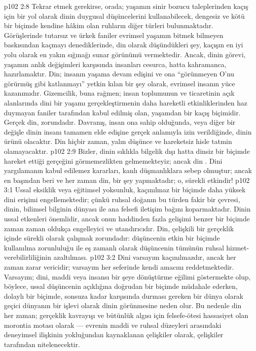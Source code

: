 \vs p102 2:8 Tekrar etmek gerekirse, orada; yaşamın sinir bozucu taleplerinden kaçış için bir yol olarak dinin duygusal düşüncelerini kullanabilecek, dengesiz ve kötü bir biçimde kendine hâkim olan ruhların diğer türleri bulunmaktadır. Görüşlerinde tutarsız ve ürkek faniler evrimsel yaşamın bitmek bilmeyen baskısından kaçmayı denediklerinde, din olarak düşündükleri şey, kaçışın en iyi yolu olarak en yakın sığınağı sunar görünümü vermektedir. Ancak, dinin görevi, yaşamın anlık değişimleri karşısında insanları cesurca, hatta kahramanca, hazırlamaktır. Din; insanın yaşama devam edişini ve ona “görünmeyen O’nu görürmüş gibi katlanmayı” yetkin kılan bir şey olarak, evrimsel insanın yüce kazanımıdır. Gizemcilik, buna rağmen; insan toplumunun ve ticaretinin açık alanlarında dini bir yaşamı gerçekleştirmenin daha hareketli etkinliklerinden haz duymayan faniler tarafından kabul edilmiş olan, yaşamdan bir kaçış biçimidir. Gerçek din,  zorundadır. Davranış, insan ona sahip olduğunda, veya diğer bir değişle dinin insanı tamamen elde edişine gerçek anlamıyla izin verildiğinde, dinin ürünü olacaktır. Din hiçbir zaman, yalın düşünce ve hareketsiz hisle tatmin olamayacaktır.
\vs p102 2:9 Bizler, dinin sıklıkla bilgelik dışı hatta dinsiz bir biçimde hareket ettiği gerçeğini görmemezlikten gelmemekteyiz; ancak din . Dini yargılamanın kabul edilemez kararları, kanlı düşmanlıklara sebep olmuştur; ancak en başından beri ve her zaman din, bir şey yapmaktadır; o, sürekli etkindir!
\vs p102 3:1 Ussal eksiklik veya eğitimsel yoksunluk, kaçınılmaz bir biçimde daha yüksek dini erişimi engellemektedir; çünkü ruhsal doğanın bu türden fakir bir çevresi, dinin, bilimsel bilginin dünyası ile ana felsefi iletişim bağını koparmaktadır. Dinin ussal etkenleri önemlidir, ancak onun haddinden fazla gelişimi benzer bir biçimde zaman zaman oldukça engelleyici ve utandırıcıdır. Din, çelişkili bir gerçeklik içinde sürekli olarak çalışmak zorundadır: düşüncenin etkin bir biçimde kullanılma zorunluluğu ile eş zamanlı olarak düşüncenin tümünün ruhsal hizmet\hyp{}verebilirliliğinin azaltılması.
\vs p102 3:2 Dini varsayım kaçınılmazdır, ancak her zaman zarar vericidir; varsayım her seferinde kendi amacını reddetmektedir. Varsayım; dini, maddi veya insansı bir şeye dönüştürme eğilimi göstermekte olup, böylece, ussal düşüncenin açıklığına doğrudan bir biçimde müdahale ederken, dolaylı bir biçimde, sonsuza kadar karşısında durması gereken bir dünya olarak geçici dünyanın bir işlevi olarak dinin görünmesine neden olur. Bu nedenle din her zaman; gerçeklik kavrayışı ve bütünlük algısı için felsefe\hyp{}ötesi hassasiyet olan morontia motası olarak --- evrenin maddi ve ruhsal düzeyleri arasındaki deneyimsel ilişkinin yokluğundan kaynaklanan çelişkiler olarak, çelişkiler tarafından nitelenecektir.
